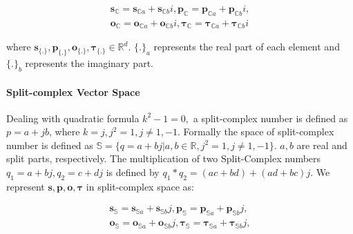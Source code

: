 \documentclass[letterpaper]{article} %
\begin{document}
\begin{equation}
\label{eq:complex}
\begin{aligned}
        \boldsymbol{s_{\mathbb{C}}}=\boldsymbol{s}_{\mathbb{C}a} + \boldsymbol{s}_{\mathbb{C}b}i, \boldsymbol{p_{\mathbb{C}}}=\boldsymbol{p}_{\mathbb{C}a} + \boldsymbol{p}_{\mathbb{C}b}i,  \\ \boldsymbol{o_{\mathbb{C}}}=\boldsymbol{o}_{\mathbb{C}a} + \boldsymbol{o}_{\mathbb{C}b}i, \boldsymbol{\tau_{\mathbb{C}}}=\boldsymbol{\tau}_{\mathbb{C}a} + \boldsymbol{\tau}_{\mathbb{C}b}i
\end{aligned}
\end{equation}

where $\boldsymbol{s}_{\{.\}}, \boldsymbol{p}_{\{.\}}, \boldsymbol{o}_{\{.\}}, \boldsymbol{\tau}_{\{.\}} \in \mathbb{R}^{d}$. ${\{.\}}_{a}$ represents the real part of each element and ${\{.\}}_{b}$ represents the imaginary part.
 
\paragraph{\textbf{Split-complex Vector Space}} 
Dealing with quadratic formula $k^2 - 1 = 0,$ a split-complex number \cite{harkin2004geometry,metahelzer2000special} is defined as $p = a + j b$, where $k = j, j^2 = 1, j \neq 1, -1.$ Formally the space of split-complex number is defined as $\mathbb{S} = \{ q = a + bj | a,b \in \mathbb{R}, j^2 = 1, j \neq 1, -1\}$. $a,b$ are real and split parts, respectively. The multiplication of two Split-Complex numbers $q_1= a+bj, q_2=c+dj$ is defined by $q_1 * q_2 = (ac+ bd) + (ad + bc) j$. We represent $\boldsymbol{s,p,o, \tau}$ in split-complex space as:

\begin{equation}
\label{eq:split}
\begin{aligned}
        \boldsymbol{s_{\mathbb{S}}}=\boldsymbol{s}_{\mathbb{S}a} + \boldsymbol{s}_{\mathbb{S}b}j, \boldsymbol{p_{\mathbb{S}}}=\boldsymbol{p}_{\mathbb{S}a} + \boldsymbol{p}_{\mathbb{S}b}j,  \\ 
        \boldsymbol{o_{\mathbb{S}}}=\boldsymbol{o}_{\mathbb{S}a} + \boldsymbol{o}_{\mathbb{S}b}j,
        \boldsymbol{\tau_{\mathbb{S}}}=\boldsymbol{\tau}_{\mathbb{S}a} + \boldsymbol{\tau}_{\mathbb{S}b}j,
\end{aligned}
\end{equation}
\end{document}
